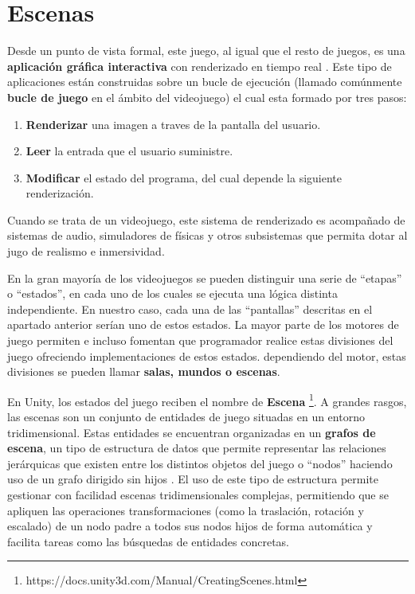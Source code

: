 \section{Escenas}
Desde un punto de vista formal, este juego, al igual que el resto de juegos, es una \textbf{aplicación gráfica interactiva} con renderizado en tiempo real \cite{libro_esi}. Este tipo de aplicaciones están construidas sobre un bucle de ejecución (llamado comúnmente \textbf{bucle de juego} en el ámbito del videojuego) el cual esta formado por tres pasos:
\begin{enumerate}
\item \textbf{Renderizar} una imagen a traves de la pantalla del usuario.
\item \textbf{Leer} la entrada que el usuario suministre.
\item \textbf{Modificar} el estado del programa, del cual depende la siguiente renderización.
\end{enumerate}
Cuando se trata de un videojuego, este sistema de renderizado es acompañado de sistemas de audio, simuladores de físicas y otros subsistemas que permita dotar al jugo de realismo e inmersividad.

En la gran mayoría de los videojuegos se pueden distinguir una serie de ``etapas'' o ``estados'', en cada uno de los cuales se ejecuta una lógica distinta independiente. En nuestro caso, cada una de las ``pantallas'' descritas en el apartado anterior serían uno de estos estados. La mayor parte de los motores de juego permiten e incluso fomentan que programador realice estas divisiones del juego ofreciendo implementaciones de estos estados. dependiendo del motor, estas divisiones se pueden llamar \textbf{salas, mundos o escenas}.

En Unity, los estados del juego reciben el nombre de \textbf{Escena} \footnote{https://docs.unity3d.com/Manual/CreatingScenes.html}. A grandes rasgos, las escenas son un conjunto de entidades de juego situadas en un entorno tridimensional. Estas entidades se encuentran organizadas en un \textbf{grafos de escena}, un tipo de estructura de datos que permite representar las relaciones jerárquicas que existen entre los distintos objetos del juego o ``nodos'' haciendo uso de un grafo dirigido sin hijos \cite{libro_esi}. El uso de este tipo de estructura permite gestionar con facilidad escenas tridimensionales complejas, permitiendo que se apliquen las operaciones transformaciones (como la traslación, rotación y escalado) de un nodo padre a todos sus nodos hijos de forma automática y facilita tareas como las búsquedas de entidades concretas.

